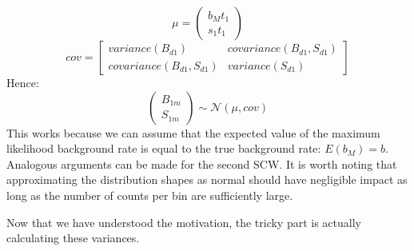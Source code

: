 \documentclass{article}
\begin{document}
\begin{equation*}
    \mu = \begin{pmatrix}
        b_Mt_1 \\ s_1t_1
    \end{pmatrix} 
\end{equation*}
\begin{equation*}
    cov = \begin{bmatrix}
        variance(B_{d1}) & covariance(B_{d1}, S_{d1})\\ covariance(B_{d1}, S_{d1}) & variance(S_{d1})
    \end{bmatrix}
\end{equation*}
Hence: 
\begin{equation*}
    \begin{pmatrix}
        B_{1m} \\ S_{1m}
    \end{pmatrix}
    \sim \mathcal{N}(\mu, cov)
\end{equation*}
This works because we can assume that the expected value of the maximum likelihood background rate is equal to the true background rate: $E(b_M) = b$. Analogous arguments can be made for the second SCW. It is worth noting that approximating the distribution shapes as normal should have negligible impact as long as the number of counts per bin are sufficiently large.

Now that we have understood the motivation, the tricky part is actually calculating these variances.
\end{document}
